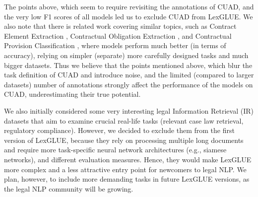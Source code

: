 \documentclass[11pt]{article}
\begin{document}
\noindent 
The points above, which seem to require revisiting the annotations of CUAD, and the very low F1 scores of all models led us to exclude CUAD from LexGLUE. We also note that there is related work covering similar topics, such as Contract Element Extraction \cite{Chalkidis2017Jurix}, Contractual Obligation Extraction \cite{chalkidis-etal-2018-obligation}, and Contractual Provision Classification \cite{tuggener-etal-2020-ledgar}, where models perform much better (in terms of accuracy), relying on simpler (separate) more carefully designed tasks and much bigger datasets. Thus we believe that the points mentioned above, which blur the task definition of CUAD and introduce noise, and the limited (compared to larger datasets) number of annotations strongly affect the performance of the models on CUAD, underestimating their true potential.

\medskip We also initially considered some very interesting legal Information Retrieval (IR) datasets \cite{locke-2018,chalkidis-etal-2021-regulatory} that aim to examine crucial real-life tasks (relevant case law retrieval, regulatory compliance). However, we decided to exclude them from the first version of LexGLUE, because they rely on processing multiple long documents and require more task-specific neural network architectures (e.g., siamese networks), and different evaluation measures. Hence, they would make LexGLUE more complex and a less attractive entry point for newcomers to legal NLP. We plan, however, to include more demanding tasks in future LexGLUE versions, as the legal NLP community will be growing.
\end{document}
